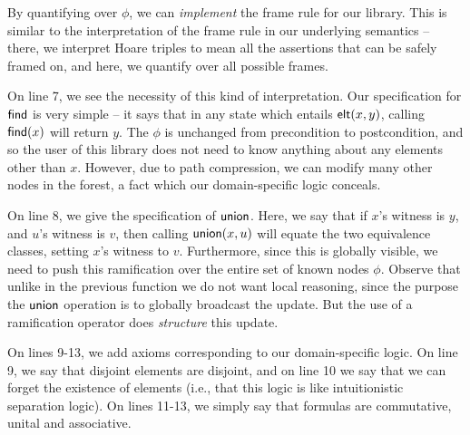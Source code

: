 By quantifying over $\phi$, we can \emph{implement} the frame rule for
our library. This is similar to the interpretation of the frame rule
in our underlying semantics -- there, we interpret Hoare triples to mean all
the assertions that can be safely framed on, and here, we quantify over
all possible frames. 

On line 7, we see the necessity of this kind of interpretation. Our
specification for $\mathsf{find}$ is very simple -- it says that in any state
which entails $\mathsf{elt}({x}, {y})$, calling $\mathsf{find}(x)$ will return $y$. The
$\phi$ is unchanged from precondition to postcondition, and so the
user of this library does not need to know anything about any elements
other than $x$. However, due to path compression, we can modify 
many other nodes in the forest, a fact which our domain-specific
logic conceals. 

On line 8, we give the specification of $\mathsf{union}$. Here, we say that if
$x$'s witness is $y$, and $u$'s witness is $v$, then calling
$\mathsf{union}(x,u)$ will equate the two equivalence classes, setting $x$'s
witness to $v$. Furthermore, since this is globally visible, we need
to push this ramification over the entire set of known nodes
$\phi$. Observe that unlike in the previous function we do not want
local reasoning, since the purpose the $\mathsf{union}$ operation is to
globally broadcast the update. But the use of a ramification operator
does \emph{structure} this update.

On lines 9-13, we add axioms corresponding to our domain-specific
logic.  On line 9, we say that disjoint elements are disjoint, and on
line 10 we say that we can forget the existence of elements (i.e., that
this logic is like intuitionistic separation logic). On lines 11-13,
we simply say that formulas are commutative, unital and associative. 

